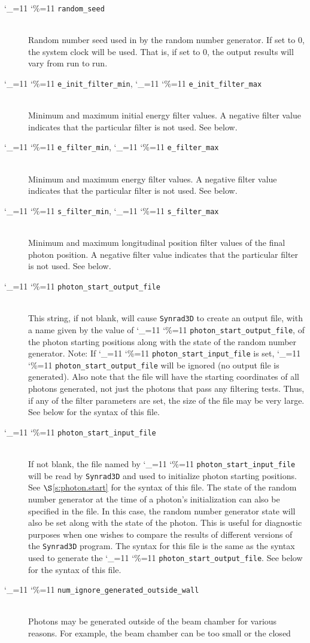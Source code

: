 \documentclass[11pt,openany]{report}
\newcommand{\sref}[1]{$\S$\ref{#1}}
\newcommand{\srthree}{\texttt{Synrad3D}\xspace}
\newcommand\ttcmd{\begingroup\catcode`\_=11 \catcode`\%=11 \dottcmd}
\newcommand\dottcmd[1]{\texttt{#1}\endgroup}
\newcommand{\vn}{\ttcmd}
\newcommand{\Newline}{\hfil \\}
\begin{document}
\begin{description}
  \item[\vn{random_seed}] \Newline
Random number seed used in by the random number generator. If set to 0, the system clock
will be used. That is, if set to 0, the output results will vary from run to run. 
  \item[\vn{e_init_filter_min}, \vn{e_init_filter_max}] \Newline
Minimum and maximum initial energy filter values. A negative filter value
indicates that the particular filter is not used. See below.
  \item[\vn{e_filter_min}, \vn{e_filter_max}] \Newline
Minimum and maximum energy filter values. A negative filter value
indicates that the particular filter is not used. See below.
  \item[\vn{s_filter_min}, \vn{s_filter_max}] \Newline
Minimum and maximum longitudinal position filter values of the final
photon position. A negative filter value indicates that the particular
filter is not used. See below.
  \item[\vn{photon_start_output_file}] \Newline
This string, if not blank, will cause \srthree to create an output
file, with a name given by the value of \vn{photon_start_output_file},
of the photon starting positions along with the state of the random
number generator. Note: If \vn{photon_start_input_file} is set,
\vn{photon_start_output_file} will be ignored (no output file is
generated). Also note that the file will have the starting coordinates
of all photons generated, not just the photons that pass any filtering
tests. Thus, if any of the filter parameters are set, the size of the
file may be very large. See below for the syntax of this file.
  \item[\vn{photon_start_input_file}] \Newline
If not blank, the file named by \vn{photon_start_input_file}
will be read by \srthree and used to initialize photon
starting positions. See \sref{s:photon.start} for the syntax of this file.
The state of the random number generator at the time of a photon's
initialization can also be specified in the file. In this case, the
random number generator state will also be set along with the state of
the photon. This is useful for diagnostic purposes when one wishes to
compare the results of different versions of the \srthree program. The
syntax for this file is the same as the syntax used to generate the
\vn{photon_start_output_file}. See below for the syntax of this file.
  \item[\vn{num_ignore_generated_outside_wall}] \Newline
Photons may be generated outside of the beam chamber for various
reasons. For example, the beam chamber can be too small or the closed

\end{description}
\end{document}
